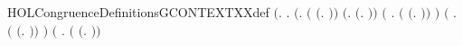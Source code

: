 \begin{SaveVerbatim}{HOLCongruenceDefinitionsGCONTEXTXXdef}
\HOLTokenTurnstile{}  \HOLSymConst{\ensuremath{=}}
   \ensuremath{(}\HOLTokenLambda{}.
        \HOLSymConst{\HOLTokenForall{}}.
            \ensuremath{(}\HOLSymConst{\HOLTokenForall{}}.
                 \ensuremath{(} \HOLSymConst{\ensuremath{=}} \ensuremath{(}\HOLTokenLambda{}. \ensuremath{)}\ensuremath{)} \HOLSymConst{\HOLTokenDisj{}} \ensuremath{(}\HOLSymConst{\HOLTokenExists{}}.  \HOLSymConst{\ensuremath{=}} \ensuremath{(}\HOLTokenLambda{}. \ensuremath{)}\ensuremath{)} \HOLSymConst{\HOLTokenDisj{}}
                 \ensuremath{(}\HOLSymConst{\HOLTokenExists{}} . \ensuremath{(} \HOLSymConst{\ensuremath{=}} \ensuremath{(}\HOLTokenLambda{}. \HOLSymConst{\ensuremath{\ldotp}} \ensuremath{)}\ensuremath{)} \HOLSymConst{\HOLTokenConj{}}  \ensuremath{)} \HOLSymConst{\HOLTokenDisj{}}
                 \ensuremath{(}\HOLSymConst{\HOLTokenExists{}}   .
                      \ensuremath{(} \HOLSymConst{\ensuremath{=}} \ensuremath{(}\HOLTokenLambda{}. \HOLSymConst{\ensuremath{\ldotp}}  \HOLSymConst{\ensuremath{+}} \HOLSymConst{\ensuremath{\ldotp}} \ensuremath{)}\ensuremath{)} \HOLSymConst{\HOLTokenConj{}}
                        \HOLSymConst{\HOLTokenConj{}}  \ensuremath{)} \HOLSymConst{\HOLTokenDisj{}}
                 \ensuremath{(}\HOLSymConst{\HOLTokenExists{}} .
                      \ensuremath{(} \HOLSymConst{\ensuremath{=}} \ensuremath{(}\HOLTokenLambda{}.   \HOLSymConst{\ensuremath{\mid}}  \ensuremath{)}\ensuremath{)} \HOLSymConst{\HOLTokenConj{}}   \HOLSymConst{\HOLTokenConj{}}

\end{SaveVerbatim}
